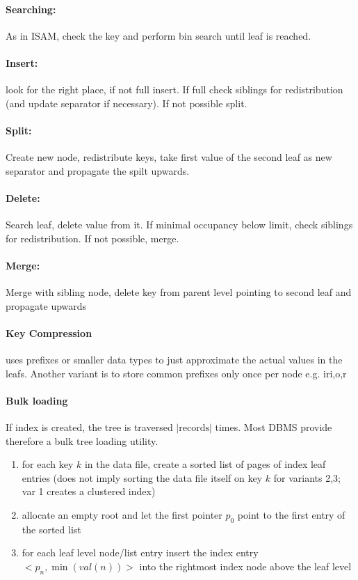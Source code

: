  \paragraph{Searching:} As in ISAM, check the key and perform bin search until leaf is reached. \\
 
 \paragraph{Insert:} look for the right place, if not full insert. If full check siblings for redistribution (and update separator if necessary). If not possible split. \\
 
 \paragraph{Split:} Create new node, redistribute keys, take first value of the second leaf as new separator and propagate the spilt upwards. \\
 
\paragraph{Delete:} Search leaf, delete value from it. If minimal occupancy below limit, check siblings for redistribution. If not possible, merge. \\

\paragraph{Merge:} Merge with sibling node, delete key from parent level pointing to second leaf and propagate upwards
 
\paragraph{Key Compression} uses prefixes or smaller data types to just approximate the actual values in the leafs. Another variant is to store common prefixes only once per node e.g. iri,o,r \\

\paragraph{Bulk loading} If index is created, the tree is traversed $|\text{records}|$ times. Most DBMS provide therefore a bulk tree loading utility.
\begin{enumerate}
    \item for each key $k$ in the data file, create a sorted list of pages of index leaf entries (does not imply sorting the data file itself on key $k$ for variants 2,3; var 1 creates a clustered index)
    \item allocate an empty root and let the first pointer $p_0$ point to the first entry of the sorted list
    \item for each leaf level node/list entry insert the index entry $<p_n, \min(val(n))>$ into the rightmost index node above the leaf level
\end{enumerate}

